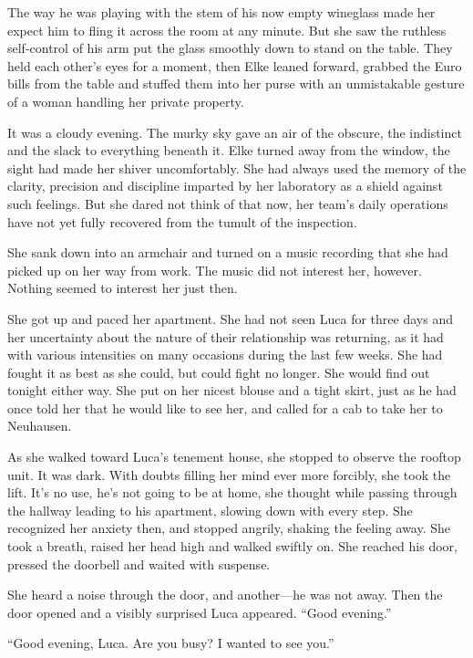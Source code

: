 The way he was playing with the stem of his now empty wineglass made her expect him to fling it across the room at any minute. But she saw the ruthless self-control of his arm put the glass smoothly down to stand on the table. They held each other's eyes for a moment, then Elke leaned forward, grabbed the Euro bills from the table and stuffed them into her purse with an unmistakable gesture of a woman handling her private property.

\sectionline

It was a cloudy evening. The murky sky gave an air of the obscure, the indistinct and the slack to everything beneath it. Elke turned away from the window, the sight had made her shiver uncomfortably. She had always used the memory of the clarity, precision and discipline imparted by her laboratory as a shield against such feelings. But she dared not think of that now, her team's daily operations have not yet fully recovered from the tumult of the inspection.

She sank down into an armchair and turned on a music recording that she had picked up on her way from work. The music did not interest her, however. Nothing seemed to interest her just then.

She got up and paced her apartment. She had not seen Luca for three days and her uncertainty about the nature of their relationship was returning, as it had with various intensities on many occasions during the last few weeks. She had fought it as best as she could, but could fight no longer. She would find out tonight either way. She put on her nicest blouse and a tight skirt, just as he had once told her that he would like to see her, and called for a cab to take her to Neuhausen.

As she walked toward Luca's tenement house, she stopped to observe the rooftop unit. It was dark. With doubts filling her mind ever more forcibly, she took the lift. It's no use, he's not going to be at home, she thought while passing through the hallway leading to his apartment, slowing down with every step. She recognized her anxiety then, and stopped angrily, shaking the feeling away. She took a breath, raised her head high and walked swiftly on. She reached his door, pressed the doorbell and waited with suspense.

She heard a noise through the door, and another---he was not away. Then the door opened and a visibly surprised Luca appeared. ``Good evening.''

``Good evening, Luca. Are you busy? I wanted to see you.''

